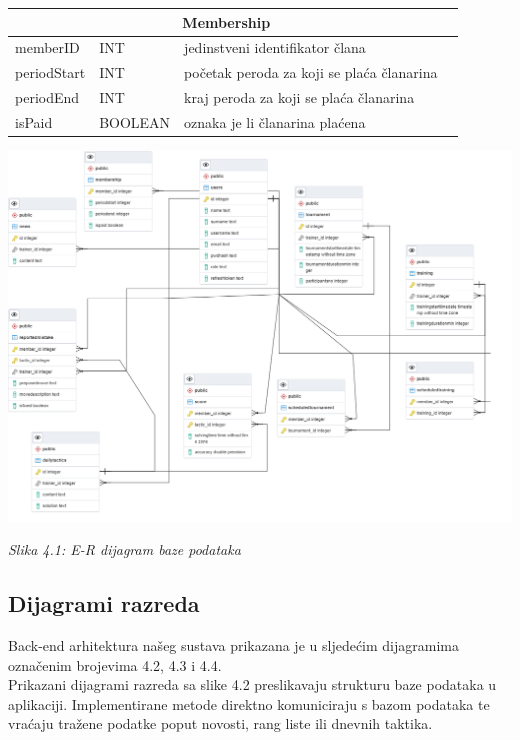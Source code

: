 \documentclass{article}
\begin{document}
\begin{center}
    \begin{tabular}{ | l | l | l | p{5cm} |}
    \hline
    \multicolumn{3}{|c|}{Membership}  \\ \hline
   \cellcolor{green!25}memberID & INT & jedinstveni identifikator člana \\ \hline
    periodStart & INT & početak peroda za koji se plaća članarina \\ \hline
    periodEnd & INT & kraj peroda za koji se plaća članarina \\ \hline
      isPaid & BOOLEAN & oznaka je li članarina plaćena\\ \hline
      
    \end{tabular}
\end{center}



	\includegraphics[width=\columnwidth]{ERbaze.png}
		\begin{center}
			\textit{Slika 4.1: E-R dijagram baze podataka}
		\end{center}

\eject

	\subsection{Dijagrami razreda}
	Back-end arhitektura našeg sustava prikazana je u sljedećim dijagramima označenim brojevima 4.2, 4.3 i 4.4.\\
	Prikazani dijagrami razreda sa slike 4.2 preslikavaju strukturu baze podataka u aplikaciji. Implementirane metode direktno komuniciraju s bazom podataka te vraćaju tražene podatke poput novosti, rang liste ili dnevnih taktika. \\
	
\end{document}
